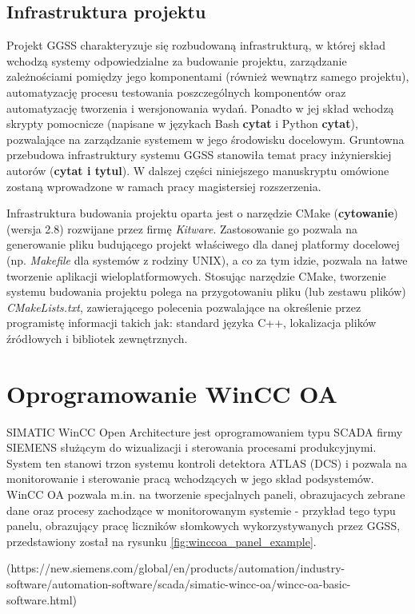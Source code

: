 \subsection{Infrastruktura projektu}
Projekt GGSS charakteryzuje się rozbudowaną infrastrukturą, w której skład wchodzą systemy odpowiedzialne za budowanie projektu, zarządzanie zależnościami pomiędzy jego komponentami (również wewnątrz samego projektu), automatyzację procesu testowania poszczególnych komponentów oraz automatyzację tworzenia i wersjonowania wydań. Ponadto w jej skład wchodzą skrypty pomocnicze (napisane w językach Bash \textbf{cytat} i Python \textbf{cytat}), pozwalające na zarządzanie systemem w jego środowisku docelowym. Gruntowna przebudowa infrastruktury systemu GGSS stanowiła temat pracy inżynierskiej autorów (\textbf{cytat i tytul}). W dalszej części niniejszego manuskryptu omówione zostaną wprowadzone w ramach pracy magistersiej rozszerzenia. 

Infrastruktura budowania projektu oparta jest o narzędzie CMake (\textbf{cytowanie}) (wersja 2.8) rozwijane przez firmę \emph{Kitware}. Zastosowanie go pozwala na generowanie pliku budującego projekt właściwego dla danej platformy docelowej (np. \emph{Makefile} dla systemów z rodziny UNIX), a co za tym idzie, pozwala na łatwe tworzenie aplikacji wieloplatformowych. Stosując narzędzie CMake, tworzenie systemu budowania projektu polega na przygotowaniu pliku (lub zestawu plików) \emph{CMakeLists.txt}, zawierającego polecenia pozwalające na określenie przez programistę informacji takich jak: standard języka C++, lokalizacja plików źródłowych i bibliotek zewnętrznych.

\section{Oprogramowanie WinCC OA}
SIMATIC WinCC Open Architecture jest oprogramowaniem typu SCADA firmy SIEMENS służącym do wizualizacji i sterowania procesami produkcyjnymi. System ten stanowi trzon systemu kontroli detektora ATLAS (DCS) i pozwala na monitorowanie i sterowanie pracą wchodzących w jego skład podsystemów. WinCC OA pozwala m.in. na tworzenie specjalnych paneli, obrazujacych zebrane dane oraz procesy zachodzące w monitorowanym systemie - przykład tego typu panelu, obrazujący pracę liczników słomkowych wykorzystywanych przez GGSS, przedstawiony został na rysunku \ref{fig:winccoa_panel_example}.

(https://new.siemens.com/global/en/products/automation/industry-software/automation-software/scada/simatic-wincc-oa/wincc-oa-basic-software.html)


